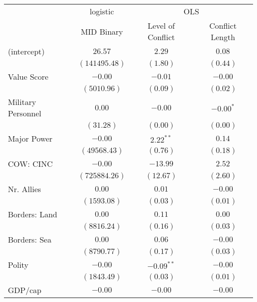 
\usepackage{booktabs}

\begin{table}
\begin{center}
\begin{tabular}{l c c c}
\toprule
 & \multicolumn{1}{c}{logistic} & \multicolumn{2}{c}{OLS} \\
\cmidrule(lr){2-2} \cmidrule(lr){3-4}
 & MID Binary & Level of Conflict & Conflict Length \\
\midrule
(intercept)                & $26.57$       & $2.29$       & $0.08$      \\
                           & $(141495.48)$ & $(1.80)$     & $(0.44)$    \\
Value Score                & $-0.00$       & $-0.01$      & $-0.00$     \\
                           & $(5010.96)$   & $(0.09)$     & $(0.02)$    \\
Military Personnel         & $0.00$        & $-0.00$      & $-0.00^{*}$ \\
                           & $(31.28)$     & $(0.00)$     & $(0.00)$    \\
Major Power                & $-0.00$       & $2.22^{**}$  & $0.14$      \\
                           & $(49568.43)$  & $(0.76)$     & $(0.18)$    \\
COW: CINC                  & $-0.00$       & $-13.99$     & $2.52$      \\
                           & $(725884.26)$ & $(12.67)$    & $(2.60)$    \\
Nr. Allies                 & $0.00$        & $0.01$       & $-0.00$     \\
                           & $(1593.08)$   & $(0.03)$     & $(0.01)$    \\
Borders: Land              & $0.00$        & $0.11$       & $0.00$      \\
                           & $(8816.24)$   & $(0.16)$     & $(0.03)$    \\
Borders: Sea               & $0.00$        & $0.06$       & $-0.00$     \\
                           & $(8790.77)$   & $(0.17)$     & $(0.03)$    \\
Polity                     & $-0.00$       & $-0.09^{**}$ & $-0.00$     \\
                           & $(1843.49)$   & $(0.03)$     & $(0.01)$    \\
GDP/cap                    & $-0.00$       & $-0.00$      & $-0.00$     \\

\end{tabular}
\end{center}
\end{table}
